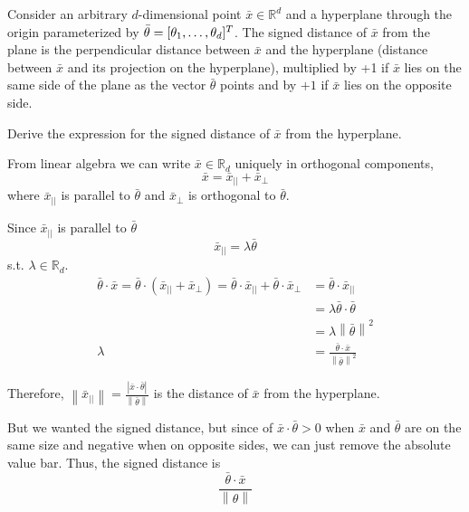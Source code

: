 \documentclass[12pt, letterpaper]{article}
\newenvironment{subsubproblem}[1]{%
  \begin{sspb}{#1}
    }{
  \end{sspb}
}
\newcommand{\R}{\mathbb{R}}
\begin{document}
\begin{subproblem}{}
    Consider an arbitrary $d$-dimensional point $\bar{x} \in \R^d$ and
a hyperplane through the origin parameterized by $\bar{\theta}=[\theta_1,\dots,\theta_d]^T$. The signed distance of $\bar{x}$ from the
plane is the perpendicular distance between $\bar{x}$ and the hyperplane (distance between $\bar{x}$ and its projection
on the hyperplane), multiplied by +1 if $\bar{x}$ lies on the same side of the plane as the vector $\bar{\theta}$ points and
by $+1$ if $\bar{x}$ lies on the opposite side.
\end{subproblem}
\begin{subsubproblem}{}
    Derive the expression for the signed distance of $\bar{x}$ from the hyperplane.
\end{subsubproblem}
\begin{solution}{}
    \setlength{\parindent}{0pt}
    From linear algebra we can write $\bar{x} \in \R_d$ uniquely in orthogonal components,
    \[\bar{x}=\bar{x}_{||}+\bar{x}_{\bot}\]
    where $\bar{x}_{||}$ is parallel to $\bar{\theta}$ and $\bar{x}_\bot$ is orthogonal to $\bar{\theta}$.

    Since $\bar{x}_{||}$ is parallel to $\bar{\theta}$
    \[\bar{x}_{||}=\lambda\bar{\theta}\]
    s.t. $\lambda \in \R_d$.
    \begin{align*}
        \bar{\theta} \cdot \bar{x} = \bar{\theta} \cdot (\bar{x}_{||}+\bar{x}_{\bot}) = \bar{\theta} \cdot \bar{x}_{||} + \bar{\theta} \cdot \bar{x}_{\bot} &= \bar{\theta} \cdot \bar{x}_{||}\\
        &=\lambda \bar{\theta} \cdot \bar{\theta}\\
        &=\lambda \left\| \bar{\theta}\right\|^2\\
        \lambda &= \frac{\bar{\theta}\cdot \bar{x}}{\left\| \bar{\theta}\right\|^2}
    \end{align*}

    Therefore, $\left\|\bar{x}_{||}\right\|=\frac{\left| \bar{x} \cdot \bar{\theta} \right|}{\left\|\bar{\theta}\right\|}$ is the distance of $\bar{x}$ from the hyperplane.

    But we wanted the signed distance, but since of $\bar{x} \cdot \bar{\theta} > 0$ when $\bar{x}$ and $\bar{\theta}$ are on the same size and negative when on opposite sides, we can just remove the absolute value bar.
    Thus, the signed distance is
    \[\frac{\bar{\theta} \cdot \bar{x}}{\left\|\theta\right\|}\]
\end{solution}
\end{document}
